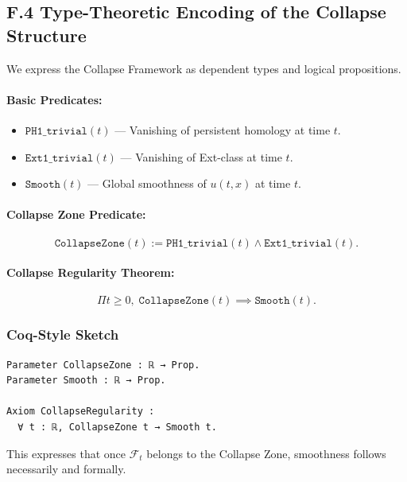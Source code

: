 \documentclass[11pt]{article}
\begin{document}
\subsection*{F.4 Type-Theoretic Encoding of the Collapse Structure}

We express the Collapse Framework as dependent types and logical propositions.

\paragraph{Basic Predicates:}

\begin{itemize}
  \item \( \texttt{PH1\_trivial}(t) \) — Vanishing of persistent homology at time \( t \).
  \item \( \texttt{Ext1\_trivial}(t) \) — Vanishing of Ext-class at time \( t \).
  \item \( \texttt{Smooth}(t) \) — Global smoothness of \( u(t, x) \) at time \( t \).
\end{itemize}

\paragraph{Collapse Zone Predicate:}

\[
\texttt{CollapseZone}(t) := \texttt{PH1\_trivial}(t) \land \texttt{Ext1\_trivial}(t).
\]

\paragraph{Collapse Regularity Theorem:}

\[
\Pi t \geq 0,\; \texttt{CollapseZone}(t) \implies \texttt{Smooth}(t).
\]

\subsubsection*{Coq-Style Sketch}

\begin{lstlisting}[language=Coq]
Parameter CollapseZone : ℝ → Prop.
Parameter Smooth : ℝ → Prop.

Axiom CollapseRegularity :
  ∀ t : ℝ, CollapseZone t → Smooth t.
\end{lstlisting}

This expresses that once \( \mathcal{F}_t \) belongs to the Collapse Zone, smoothness follows necessarily and formally.
\end{document}
